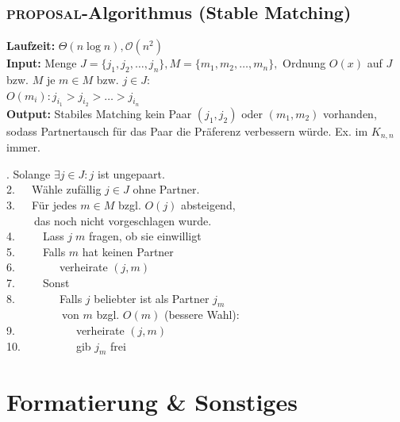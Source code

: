 \documentclass[10pt,a4paper,ngerman,oneside,]{article}
\begin{document}
\begin{multicols}{2}
\subsection{\textsc{proposal}-Algorithmus (Stable Matching)}
\textbf{Laufzeit:} $\Theta(n\log n),\mathcal{O}(n^2)$\\
\textbf{Input:} Menge $J=\{j_1,j_2,\dots,j_n\}, M=\{m_1,m_2,\dots,m_n\},$ Ordnung $O(x)$ auf $J$ bzw. $M$ je $m\in M$ bzw. $j\in J$: \\$O(m_i): j_{i_1}>j_{i_2}>\dots > j_{i_n}$\\
\textbf{Output:} Stabiles Matching kein Paar $(j_1,j_2)$ oder $(m_1,m_2)$ vorhanden, sodass Partnertausch für das Paar die Präferenz verbessern würde. Ex. im $K_{n,n}$ immer.
\begin{flushleft}
. Solange $\exists j\in J: j $ ist ungepaart. \\
2.~~~Wähle zufällig $j\in J$ ohne Partner.\\
3.~~~Für jedes $m\in M$ bzgl. $O(j)$ absteigend,\\
~~~~~das noch nicht vorgeschlagen wurde. \\
4.~~~~~Lass $j\;m$ fragen, ob sie einwilligt\\
5.~~~~~Falls $m$ hat keinen Partner\\
6.~~~~~~~~verheirate $(j,m)$\\
7.~~~~~Sonst\\
8.~~~~~~~~Falls $j$ beliebter ist als Partner $j_m$\\
~~~~~~~~~~von $m$ bzgl. $O(m)$ (bessere Wahl):\\
9.~~~~~~~~~~~verheirate $(j,m)$\\
10.~~~~~~~~~~gib $j_m$ frei\\ 
\end{flushleft}

\end{multicols}

\section{Formatierung \& Sonstiges}
\end{document}
